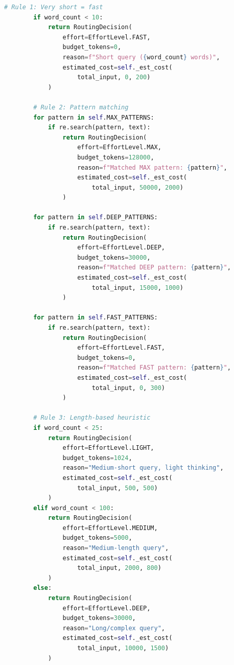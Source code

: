 \documentclass[11pt,a4paper]{article}
\begin{document}
\begin{lstlisting}[language=Python, caption={Production Fast Mode Router with Cost Tracking}]
        # Rule 1: Very short = fast
        if word_count < 10:
            return RoutingDecision(
                effort=EffortLevel.FAST,
                budget_tokens=0,
                reason=f"Short query ({word_count} words)",
                estimated_cost=self._est_cost(
                    total_input, 0, 200)
            )
        
        # Rule 2: Pattern matching
        for pattern in self.MAX_PATTERNS:
            if re.search(pattern, text):
                return RoutingDecision(
                    effort=EffortLevel.MAX,
                    budget_tokens=128000,
                    reason=f"Matched MAX pattern: {pattern}",
                    estimated_cost=self._est_cost(
                        total_input, 50000, 2000)
                )
        
        for pattern in self.DEEP_PATTERNS:
            if re.search(pattern, text):
                return RoutingDecision(
                    effort=EffortLevel.DEEP,
                    budget_tokens=30000,
                    reason=f"Matched DEEP pattern: {pattern}",
                    estimated_cost=self._est_cost(
                        total_input, 15000, 1000)
                )
        
        for pattern in self.FAST_PATTERNS:
            if re.search(pattern, text):
                return RoutingDecision(
                    effort=EffortLevel.FAST,
                    budget_tokens=0,
                    reason=f"Matched FAST pattern: {pattern}",
                    estimated_cost=self._est_cost(
                        total_input, 0, 300)
                )
        
        # Rule 3: Length-based heuristic
        if word_count < 25:
            return RoutingDecision(
                effort=EffortLevel.LIGHT,
                budget_tokens=1024,
                reason="Medium-short query, light thinking",
                estimated_cost=self._est_cost(
                    total_input, 500, 500)
            )
        elif word_count < 100:
            return RoutingDecision(
                effort=EffortLevel.MEDIUM,
                budget_tokens=5000,
                reason="Medium-length query",
                estimated_cost=self._est_cost(
                    total_input, 2000, 800)
            )
        else:
            return RoutingDecision(
                effort=EffortLevel.DEEP,
                budget_tokens=30000,
                reason="Long/complex query",
                estimated_cost=self._est_cost(
                    total_input, 10000, 1500)
            )
    

\end{lstlisting}
\end{document}
